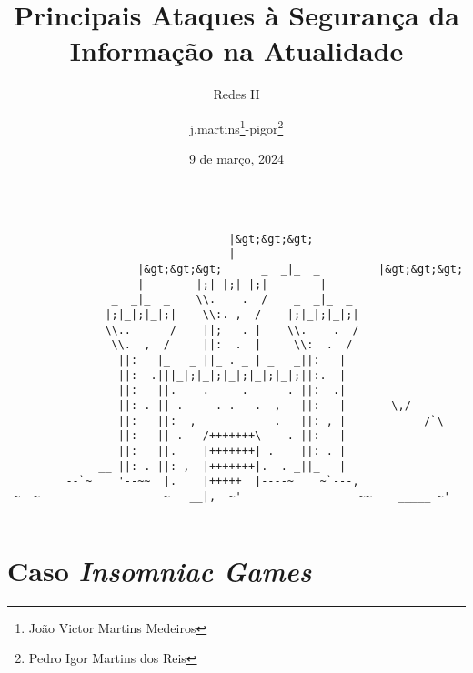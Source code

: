 \documentclass[bookmarks=false,aspectratio=169,9pt]{beamer}
\date{9 de março, 2024}
\title[Seminário - Redes II]{Principais Ataques à Segurança da Informação na Atualidade}
\institute[Pontifícia Universidade Católica de Minas Gerais]{@pucminas}
\author{j.martins\footnote{João Victor Martins Medeiros}-pigor\footnote{Pedro Igor Martins dos Reis}}
\subtitle{Redes II}
\begin{document}
\begin{frame}[fragile]
\begin{columns}
\begin{column}{\textwidth}
\begin{verbatim}
                                  |&gt;&gt;&gt;
                                  |
                    |&gt;&gt;&gt;      _  _|_  _         |&gt;&gt;&gt;
                    |        |;| |;| |;|        |
                _  _|_  _    \\.    .  /    _  _|_  _
               |;|_|;|_|;|    \\:. ,  /    |;|_|;|_|;|
               \\..      /    ||;   . |    \\.    .  /
                \\.  ,  /     ||:  .  |     \\:  .  /
                 ||:   |_   _ ||_ . _ | _   _||:   |
                 ||:  .|||_|;|_|;|_|;|_|;|_|;||:.  |
                 ||:   ||.    .     .      . ||:  .|
                 ||: . || .     . .   .  ,   ||:   |       \,/
                 ||:   ||:  ,  _______   .   ||: , |            /`\
                 ||:   || .   /+++++++\    . ||:   |
                 ||:   ||.    |+++++++| .    ||: . |
              __ ||: . ||: ,  |+++++++|.  . _||_   |
     ____--`~    '--~~__|.    |+++++__|----~    ~`---,
-~--~                   ~---__|,--~'                  ~~----_____-~'
\end{verbatim}
\end{column}
\end{columns}
\end{frame}
\begin{frame}
	\titlepage
\end{frame}
\section{Caso \textit{Insomniac Games}}
\end{document}
